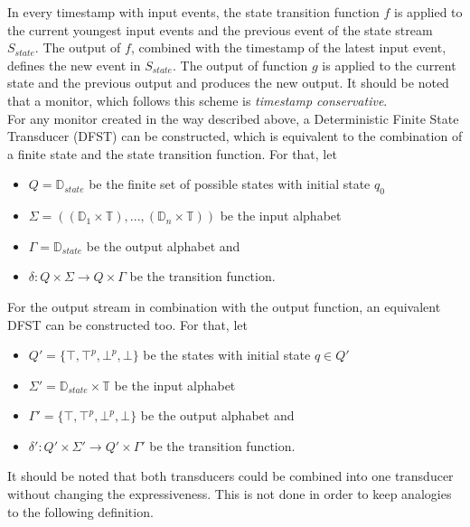		In every timestamp with input events, the state transition function $f$ is applied to the current youngest input events and the previous event of the state stream $S_{state}$. The output of $f$, combined with the timestamp of the latest input event, defines the new event in $S_{state}$. The output of function $g$ is applied to the current state and the previous output and produces the new output. It should be noted that a monitor, which follows this scheme is \textit{timestamp conservative}.\\
		For any monitor created in the way described above, a Deterministic Finite State Transducer (DFST) can be constructed, which is equivalent to the combination of a finite state and the state transition function. For that, let
		\begin{itemize}
			\item
			$Q=\mathbb{D}_{state}$ be the finite set of possible states with initial state $q_0$
			\item
			$\Sigma=((\mathbb{D}_1\times \mathbb{T}),...,(\mathbb{D}_n\times \mathbb{T}))$ be the input alphabet
			\item
			$\Gamma = \mathbb D_{state}$ be the output alphabet and
			\item
			$\delta: Q\times \Sigma\rightarrow Q\times\Gamma$ be the transition function.
		\end{itemize}
		For the output stream in combination with the output function, an equivalent DFST can be constructed too. For that, let
		\begin{itemize}
			\item
				$Q' = \{\top, \top^p, \bot^p, \bot\}$ be the states with initial state $q\in Q'$
			\item
				$\Sigma'=\mathbb D_{state}\times \mathbb{T}$ be the input alphabet
			\item
				$\Gamma' = \{\top, \top^p, \bot^p, \bot\}$ be the output alphabet and
			\item
				$\delta': Q'\times \Sigma'\rightarrow Q'\times\Gamma'$ be the transition function.
		\end{itemize}
		It should be noted that both transducers could be combined into one transducer without changing the expressiveness. This is not done in order to keep analogies to the following definition.
